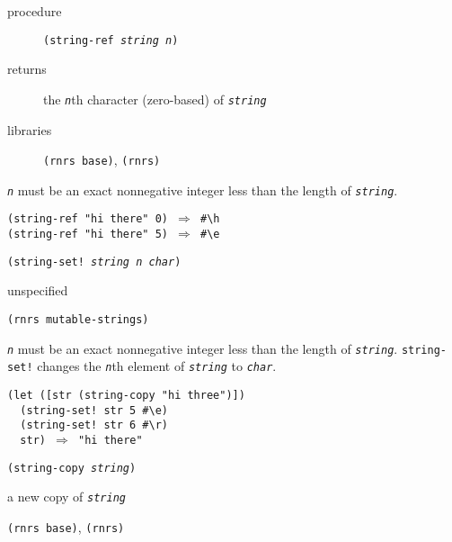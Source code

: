 \begin{description}

\label{objects_s220}\item[procedure] \texttt{(string-ref \textit{string} \textit{n})}



\item[returns] the \texttt{\textit{n}}th character (zero-based) of \texttt{\textit{string}}


\item[libraries] \texttt{(rnrs base)}, \texttt{(rnrs)}
\end{description}

\texttt{\textit{n}} must be an exact nonnegative integer less than
the length of \texttt{\textit{string}}.

\begin{alltt}
(string-ref "hi there" 0) \(\Rightarrow\) \#{}\textbackslash{}h
(string-ref "hi there" 5) \(\Rightarrow\) \#{}\textbackslash{}e
\end{alltt}

\begin{description}

\label{objects_s221}\item[procedure] \texttt{(string-set! \textit{string} \textit{n} \textit{char})}



\item[returns] unspecified


\item[libraries] \texttt{(rnrs mutable-strings)}
\end{description}

\texttt{\textit{n}} must be an exact nonnegative integer less than
the length of \texttt{\textit{string}}.
\texttt{string-set!} changes the \texttt{\textit{n}}th element of \texttt{\textit{string}} to \texttt{\textit{char}}.

\begin{alltt}
(let ([str (string-copy "hi three")])
  (string-set! str 5 \#{}\textbackslash{}e)
  (string-set! str 6 \#{}\textbackslash{}r)
  str) \(\Rightarrow\) "hi there"
\end{alltt}

\begin{description}

\label{objects_s222}\item[procedure] \texttt{(string-copy \textit{string})}



\item[returns] a new copy of \texttt{\textit{string}}


\item[libraries] \texttt{(rnrs base)}, \texttt{(rnrs)}
\end{description}


